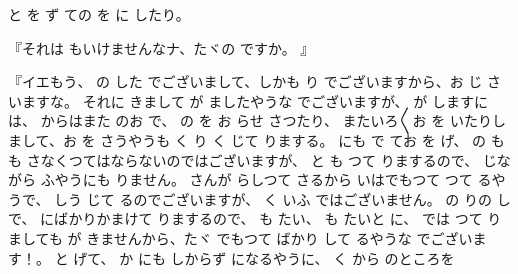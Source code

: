 と
を
ず
ての
を
に
したり。

『それは
もいけませんなナ、たヾの
ですか。
』

『イエもう、
の
した
でございまして、しかも
り
でございますから、お
じ
さいますな。
それに
きまして
が
ましたやうな
でございますが、
が
しますには、
からはまた
のお
で、
の
を
お
らせ
さつたり、
またいろ〳〵お
を
いたりしまして、お
を
さうやうも
く
り
く
じて
りまする。
にも
で
てお
を
げ、
の
も
も
さなくつてはならないのではございますが、
と
も
つて
りまするので、
じながら
ふやうにも
りません。
さんが
らしつて
さるから
いはでもつて
つて
るやうで、
しう
じて
るのでございますが、
く
いふ
ではございません。
の
りの
しで、
にばかりかまけて
りまするので、
も
たい、
も
たいと
に、
では
つて
りましても
が
きませんから、たヾ
でもつて
ばかり
して
るやうな
でございます！。
と
げて、
か
にも
しからず
になるやうに、
く
から
のところを
